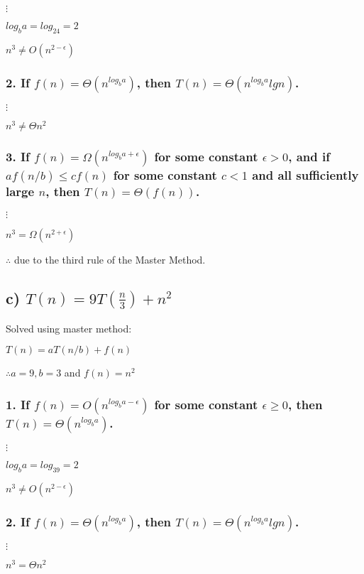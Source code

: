 \documentclass{article}
\begin{document}
$\vdots$

$log_ba = log_24 = 2$

$n^3 \neq O(n^{2 - \epsilon})$

\subsubsection*{2. If $f(n) = \Theta(n^{log_ba})$, then $T(n) = \Theta(n^{log_ba}lgn)$.}

$\vdots$

$n^3 \neq \Theta n^2$

\subsubsection*{3. If $f(n) = \Omega(n^{log_ba + \epsilon})$ for some constant $\epsilon > 0$, and if $af(n/b) \leq cf(n)$ for some constant $c < 1$ and all sufficiently large $n$, then $T(n) = \Theta(f(n))$.}

$\vdots$

$n^3 = \Omega(n^{2 + \epsilon})$

$\therefore$  due to the third rule of the Master Method.

\subsection*{c) $T(n) = 9T(\frac{n}{3}) + n^2$}

Solved using master method:

$T(n) = aT(n/b) + f(n)$

$\therefore a = 9, b = 3$ and $f(n) = n^2$

\subsubsection*{1. If $f(n) = O(n^{log_ba - \epsilon})$ for some constant $\epsilon \geq  0$, then $T(n) = \Theta(n^{log_ba})$.}

$\vdots$

$log_ba = log_39 = 2$

$n^3 \neq O(n^{2 - \epsilon})$

\subsubsection*{2. If $f(n) = \Theta(n^{log_ba})$, then $T(n) = \Theta(n^{log_ba}lgn)$.}

$\vdots$

$n^3 = \Theta n^2$
\end{document}
